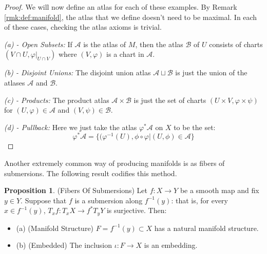 \documentclass[12pt]{article}
\theoremstyle{definition}
\newtheorem{proposition}[theorem]{Proposition}
\numberwithin{equation}{section}
\begin{document}
\begin{proof} We will now define an atlas for each of these examples. By Remark \ref{rmk:def:manifold}, the atlas that we define doesn't need to be maximal. In each of these cases, checking the atlas axioms is trivial.

\vspace{5pt}

\emph{(a) - Open Subsets:} If $\mathcal{A}$ is the atlas of $M$, then the atlas $\mathcal{B}$ of $U$ consists of charts $(V \cap U, \varphi|_{U \cap V})$ where $(V,\varphi)$ is a chart in $\mathcal{A}$.

\vspace{5pt}

\emph{(b) - Disjoint Unions:} The disjoint union atlas $\mathcal{A} \sqcup \mathcal{B}$ is just the union of the atlases $\mathcal{A}$ and $\mathcal{B}$.  

\vspace{5pt} 

\emph{(c) - Products:} The product atlas $\mathcal{A} \times \mathcal{B}$ is just the set of charts $(U \times V,\varphi \times \psi)$ for $(U,\varphi) \in \mathcal{A}$ and $(V,\psi) \in \mathcal{B}$.

\vspace{5pt}

\emph{(d) - Pullback:} Here we just take the atlas $\varphi^*\mathcal{A}$ on $X$ to be the set:
\[
\varphi^*\mathcal{A} = \{(\varphi^{-1}(U),\phi \circ \varphi| (U,\phi) \in \mathcal{A}\}
\] \end{proof}

Another extremely common way of producing manifolds is as fibers of submersions. The following result codifies this method. 

\begin{proposition} (Fibers Of Submersions) Let $f:X \to Y$ be a smooth map and fix $y \in Y$. Suppose that $f$ is a submersion along $f^{-1}(y)$: that is, for every $x \in f^{-1}(y)$, $T_xf:T_xX \to f^*T_yY$ is surjective. Then:
\begin{itemize}
\item{(a)} (Manifold Structure) $F = f^{-1}(y) \subset X$ has a natural manifold structure.
\item{(b)} (Embedded) The inclusion $\iota:F \to X$ is an embedding.
\end{itemize}
\end{proposition}
\end{document}
